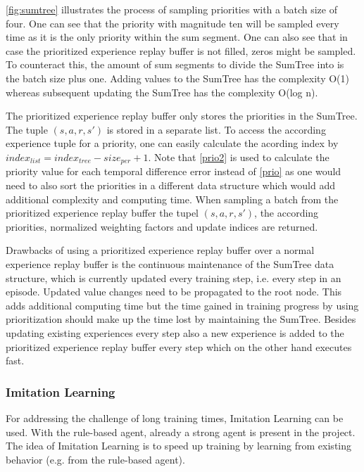 \autoref{fig:sumtree} illustrates the process of sampling priorities with a batch size of four. One can see that the priority with magnitude ten will be sampled every time as it is the only priority within the sum segment. One can also see that in case the prioritized experience replay buffer is not filled, zeros might be sampled. To counteract this, the amount of sum segments to divide the SumTree into is the batch size plus one. Adding values to the SumTree has the complexity O(1) whereas subsequent updating the SumTree has the complexity O(log n). 

The prioritized experience replay buffer only stores the priorities in the SumTree. The tuple $(s,a,r,s')$ is stored in a separate list. To access the according experience tuple for a priority, one can easily calculate the acording index by $index_{list} = index_{tree} - size_{per} + 1$. Note that \autoref{prio2} is used to calculate the priority value for each temporal difference error instead of \autoref{prio} as one would need to also sort the priorities in a different data structure which would add additional complexity and computing time. When sampling a batch from the prioritized experience replay buffer the tupel $(s,a,r,s')$, the according priorities, normalized weighting factors and update indices are returned. 

Drawbacks of using a prioritized experience replay buffer over a normal experience replay buffer is the continuous maintenance of the SumTree data structure, which is currently updated every training step, i.e. every step in an episode. Updated value changes need to be propagated to the root node. This adds additional computing time but the time gained in training progress by using prioritization should make up the time lost by maintaining the SumTree. Besides updating existing experiences every step also a new experience is added to the prioritized experience replay buffer every step which on the other hand executes fast. 

\subsubsection{Imitation Learning}
\label{ch:approachBc}

For addressing the challenge of long training times, Imitation Learning can be used. With the rule-based agent, already a strong agent is present in the project. The idea of Imitation Learning is to speed up training by learning from existing behavior (e.g. from the rule-based agent).

